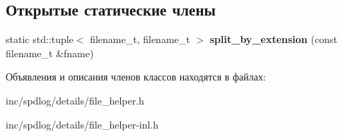 \subsection*{Открытые статические члены}
\begin{DoxyCompactItemize}
\item 
\mbox{\label{classspdlog_1_1details_1_1file__helper_a8e8a852ddd73ca81061a62a9c1ca51c5}} 
static std\+::tuple$<$ filename\+\_\+t, filename\+\_\+t $>$ {\bfseries split\+\_\+by\+\_\+extension} (const filename\+\_\+t \&fname)
\end{DoxyCompactItemize}


Объявления и описания членов классов находятся в файлах\+:\begin{DoxyCompactItemize}
\item 
inc/spdlog/details/file\+\_\+helper.\+h\item 
inc/spdlog/details/file\+\_\+helper-\/inl.\+h\end{DoxyCompactItemize}
